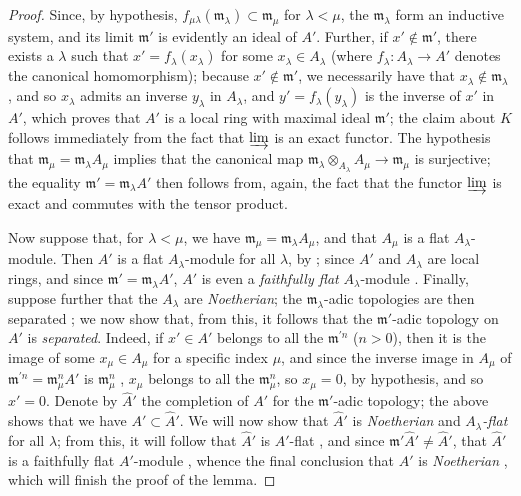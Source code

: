 \begin{proof}
Since, by hypothesis, $f_{\mu\lambda}(\mathfrak{m}_\lambda)\subset\mathfrak{m}_\mu$ for $\lambda<\mu$, the $\mathfrak{m}_\lambda$ form an inductive system, and its limit $\mathfrak{m}'$ is evidently an ideal of $A'$.
Further, if $x'\not\in\mathfrak{m}'$, there exists a $\lambda$ such that $x'=f_\lambda(x_\lambda)$ for some $x_\lambda\in A_\lambda$ (where $f_\lambda:A_\lambda\to A'$ denotes the canonical homomorphism);
because $x'\not\in\mathfrak{m}'$, we necessarily have that $x_\lambda\not\in\mathfrak{m}_\lambda$, and so $x_\lambda$ admits an inverse $y_\lambda$ in $A_\lambda$, and $y'=f_\lambda(y_\lambda)$ is the inverse of $x'$ in $A'$, which proves that $A'$ is a local ring with maximal ideal $\mathfrak{m}'$;
the claim about $K$ follows immediately from the fact that $\varinjlim$ is an exact functor.
The hypothesis that $\mathfrak{m}_\mu=\mathfrak{m}_\lambda A_\mu$ implies that the canonical map $\mathfrak{m}_\lambda\otimes_{A_\lambda}A_\mu\to\mathfrak{m}_\mu$ is surjective;
the equality $\mathfrak{m}'=\mathfrak{m}_\lambda A'$ then follows from, again, the fact that the functor $\varinjlim$ is exact and commutes with the tensor product.

Now suppose that, for $\lambda<\mu$, we have $\mathfrak{m}_\mu=\mathfrak{m}_\lambda A_\mu$, and that $A_\mu$ is a flat $A_\lambda$-module.
Then $A'$ is a flat $A_\lambda$-module for all $\lambda$, by ;
since $A'$ and $A_\lambda$ are local rings, and since $\mathfrak{m}'=\mathfrak{m}_\lambda A'$, $A'$ is even a \emph{faithfully flat} $A_\lambda$-module .
Finally, suppose further that the $A_\lambda$ are \emph{Noetherian};
the $\mathfrak{m}_\lambda$-adic topologies are then separated ;
we now show that, from this, it follows that the $\mathfrak{m}'$-adic topology on $A'$ is \emph{separated}.
Indeed, if $x'\in A'$ belongs to all the $\mathfrak{m}^{'n}$ ($n>0$), then it is the image of some $x_\mu\in A_\mu$ for a specific index $\mu$, and since the inverse image in $A_\mu$ of $\mathfrak{m}^{'n}=\mathfrak{m}_\mu^n A'$ is $\mathfrak{m}_\mu^n$ , $x_\mu$ belongs to all the $\mathfrak{m}_\mu^n$, so $x_\mu=0$, by hypothesis, and so $x'=0$.
Denote by $\widehat{A}'$ the completion of $A'$ for the $\mathfrak{m}'$-adic topology;
the above shows that we have $A'\subset\widehat{A}'$.
We will now show that $\widehat{A}'$ is \emph{Noetherian} and \emph{$A_\lambda$-flat} for all $\lambda$;
from this,
it will follow that $\widehat{A}'$ is $A'$-flat , and since $\mathfrak{m}'\widehat{A}'\neq\widehat{A}'$, that $\widehat{A}'$ is a faithfully flat $A'$-module , whence the final conclusion that $A'$ is \emph{Noetherian} , which will finish the proof of the lemma.


\end{proof}

